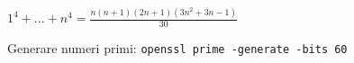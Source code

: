 \begin{center}
$1^4+...+n^4=\frac{n(n+1)(2n+1)(3n^2+3n-1)}{30} $
\end{center}
Generare numeri primi: \verb|openssl prime -generate -bits 60|

